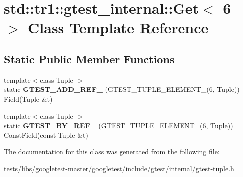 \hypertarget{classstd_1_1tr1_1_1gtest__internal_1_1Get_3_016_01_4}{}\section{std\+:\+:tr1\+:\+:gtest\+\_\+internal\+:\+:Get$<$ 6 $>$ Class Template Reference}
\label{classstd_1_1tr1_1_1gtest__internal_1_1Get_3_016_01_4}
\subsection*{Static Public Member Functions}
\begin{DoxyCompactItemize}
\item 
\mbox{\label{classstd_1_1tr1_1_1gtest__internal_1_1Get_3_016_01_4_a28034152d066c8644fa55e9fc0e3a12d}} 
{\footnotesize template$<$class Tuple $>$ }\\static {\bfseries G\+T\+E\+S\+T\+\_\+\+A\+D\+D\+\_\+\+R\+E\+F\+\_\+} (G\+T\+E\+S\+T\+\_\+\+T\+U\+P\+L\+E\+\_\+\+E\+L\+E\+M\+E\+N\+T\+\_\+(6, Tuple)) Field(Tuple \&t)
\item 
\mbox{\label{classstd_1_1tr1_1_1gtest__internal_1_1Get_3_016_01_4_a6e396b998757e0ab9b75db0c68a7c360}} 
{\footnotesize template$<$class Tuple $>$ }\\static {\bfseries G\+T\+E\+S\+T\+\_\+\+B\+Y\+\_\+\+R\+E\+F\+\_\+} (G\+T\+E\+S\+T\+\_\+\+T\+U\+P\+L\+E\+\_\+\+E\+L\+E\+M\+E\+N\+T\+\_\+(6, Tuple)) Const\+Field(const Tuple \&t)
\end{DoxyCompactItemize}


The documentation for this class was generated from the following file\+:\begin{DoxyCompactItemize}
\item 
tests/libs/googletest-\/master/googletest/include/gtest/internal/gtest-\/tuple.\+h\end{DoxyCompactItemize}
